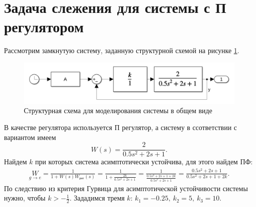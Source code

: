 \section{Задача слежения для системы с П регулятором}

Рассмотрим замкнутую систему, заданную структурной схемой на рисунке \ref{fig:task_3_xls}.
\begin{figure}[H]
    \centering
    \includegraphics[width=1\textwidth]{figs/task_3_slx.png}
    \caption{Структурная схема для моделирования системы в общем виде}
    \label{fig:task_3_xls}
\end{figure}
В качестве регулятора используется П регулятор, а систему в ссответствии с вариантом
имеем
\begin{equation*}
    W(s)=\frac{2}{0.5s^2+2s+1}.
\end{equation*}
Найдем $k$ при которых система асимптотически устойчива, для этого найдем ПФ:
\begin{multline*}
    \underset{g\rightarrow e}{W} = \frac{1}{1+W(s)W_\text{рег}(s)}
    =\frac{1}{1+\frac{2k}{0.5s^2+2s+1}}=\frac{1}{\frac{0.5s^2+2s+1+2k}{0.5s^2+2s+1}}=\frac{0.5s^2+2s+1}{0.5s^2+2s+1+2k}.
\end{multline*}
По следствию из критерия Гурвица для асимптотической устойчивости системы нужно,
чтобы $k>-\frac{1}{2}$. Зададимся тремя $k$: $k_1=-0.25,\ k_2=5,\ k_3=10$.

